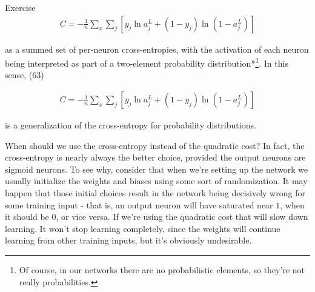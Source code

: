 \begin{exerciseBox}{Exercise}
\begin{align*}
C = -\frac{1}{n} \sum_x \sum_j \left[y_j \ln a^L_j + (1-y_j) \ln (1-a^L_j) \right] \nonumber
\end{align*}

\noindent as a summed set of per-neuron cross-entropies, with the activation of each neuron being interpreted as part of a two-element probability distribution*\footnote{Of course, in our networks there are no probabilistic elements, so they're not really probabilities.}. In this sense, (63)

\begin{align*}
C = -\frac{1}{n} \sum_x \sum_j \left[y_j \ln a^L_j + (1-y_j) \ln (1-a^L_j) \right] \nonumber
\end{align*}

\noindent is a generalization of the cross-entropy for probability distributions.


When should we use the cross-entropy instead of the quadratic cost? In fact, the cross-entropy is nearly always the better choice, provided the output neurons are sigmoid neurons. To see why, consider that when we're setting up the network we usually initialize the weights and biases using some sort of randomization. It may happen that those initial choices result in the network being decisively wrong for some training input - that is, an output neuron will have saturated near $1$, when it should be $0$, or vice versa. If we're using the quadratic cost that will slow down learning. It won't stop learning completely, since the weights will continue learning from other training inputs, but it's obviously undesirable.

\end{exerciseBox}



